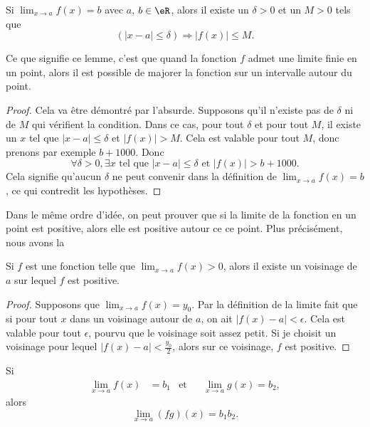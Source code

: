 \begin{lemma}       \label{LemLimMajorableVois}
    Si $\lim_{x\to a}f(x)=b$ avec $a$, $b\in\eR$, alors il existe un $\delta>0$ et un $M>0$ tels que 
    \[ 
        (| x-a |\leq\delta)\Rightarrow | f(x) |\leq M.
    \]

\end{lemma}

Ce que signifie ce lemme, c'est que quand la fonction $f$ admet une limite finie en un point, alors il est possible de majorer la fonction sur un intervalle autour du point.

\begin{proof}
    Cela va être démontré par l'absurde. Supposons qu'il n'existe pas de $\delta$ ni de $M$ qui vérifient la condition. Dans ce cas, pour tout $\delta$ et pour tout $M$, il existe un $x$ tel que $| x-a |\leq\delta$ et $| f(x) |> M$. Cela est valable pour tout $M$, donc prenons par exemple $b+1000$. Donc 
    \begin{equation}
    \forall\delta>0,\exists x\text{ tel que } | x-a |\leq\delta\text{ et }| f(x) |>b+1000.
    \end{equation}
    Cela signifie qu'aucun $\delta$ ne peut convenir dans la définition de $\lim_{x\to a}f(x)=b$, ce qui contredit les hypothèses.
\end{proof}

Dans le même ordre d'idée, on peut prouver que si la limite de la fonction en un point est positive, alors elle est positive autour ce ce point. Plus précisément, nous avons la
\begin{proposition} \label{PropoLimPosFPos}
    Si $f$ est une fonction telle que $\lim_{x\to a}f(x)>0$, alors il existe un voisinage de $a$ sur lequel $f$ est positive.
\end{proposition}   

\begin{proof}
    Supposons que $\lim_{x\to a}f(x)=y_0$. Par la définition de la limite fait que si pour tout $x$ dans un voisinage autour de $a$, on ait $| f(x)-a |<\epsilon$. Cela est valable pour tout $\epsilon$, pourvu que le voisinage soit assez petit. Si je choisit un voisinage pour lequel $| f(x)-a |<\frac{ y_0 }{ 2 }$, alors sur ce voisinage, $f$ est positive.
\end{proof}


\begin{theorem}     \label{Tholimfgabab}
    Si
    \begin{align}
        \lim_{x\to a}f(x)&=b_1&\text{et}&&\lim_{x\to a}g(x)=b_2,
    \end{align}
    alors
    \begin{equation}
        \lim_{x\to a}(fg)(x)=b_1b_2.
    \end{equation}
\end{theorem}

